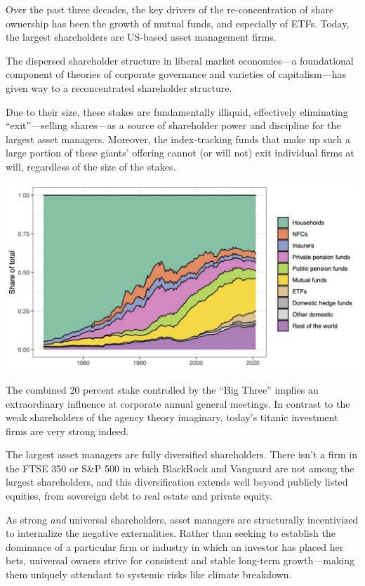 \documentclass[
]{book}
\begin{document}
Over the past three decades, the key drivers of the re-concentration of share ownership has been the growth of mutual funds, and especially of ETFs. Today, the largest shareholders are US-based asset management firms.

The dispersed shareholder structure in liberal market economies---a foundational component of theories of corporate governance and varieties of capitalism---has given way to a reconcentrated shareholder structure.

Due to their size, these stakes are fundamentally illiquid, effectively eliminating ``exit''---selling shares---as a source of shareholder power and discipline for the largest asset managers. Moreover, the index-tracking funds that make up such a large portion of these giants' offering cannot (or will not) exit individual firms at will, regardless of the size of the stakes.

\includegraphics{fig/US_Equity_Ownership_1945-2021.jpg}

The combined 20 percent stake controlled by the ``Big Three'' implies an extraordinary influence at corporate annual general meetings.
In contrast to the weak shareholders of the agency theory imaginary, today's titanic investment firms are very strong indeed.

The largest asset managers are fully diversified shareholders. There isn't a firm in the FTSE 350 or S\&P 500 in which BlackRock and Vanguard are not among the largest shareholders, and this diversification extends well beyond publicly listed equities, from sovereign debt to real estate and private equity.

As strong \emph{and} universal shareholders, asset managers are structurally incentivized to internalize the negative externalities.
Rather than seeking to establish the dominance of a particular firm or industry in which an investor has placed her bets, universal owners strive for consistent and stable long-term growth---making them uniquely attendant to systemic risks like climate breakdown.
\end{document}
